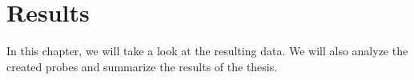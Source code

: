 \chapter[Results]{Results}
\label{kap:results}

In this chapter, we will take a look at the resulting data. We will also analyze the created probes and summarize the results of the thesis.  

